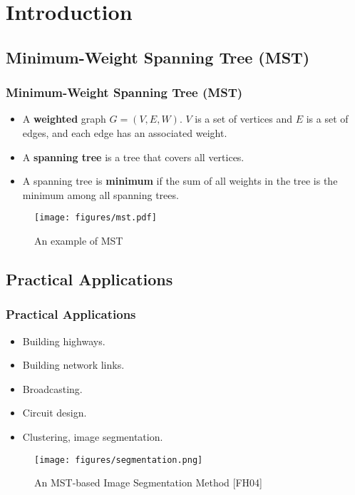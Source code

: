 \section{Introduction}

\subsection{Minimum-Weight Spanning Tree (MST)}

\begin{frame}
\frametitle{Minimum-Weight Spanning Tree (MST)}

\begin{itemize}
  \item A \textbf{weighted} graph $G = (V,E,W)$. $V$ is a set of vertices and $E$ is a set of edges, and each edge has an associated weight.
  \item A \textbf{spanning tree} is a tree that covers all vertices.
  \item A spanning tree is \textbf{minimum} if the sum of all weights in the tree is the minimum among all spanning trees.
\end{itemize}
\begin{figure}
    \centering
    \texttt{[image: figures/mst.pdf]}
    \caption{An example of MST}
\end{figure}
\end{frame}

\subsection{Practical Applications}

\begin{frame}
\frametitle{Practical Applications}
\begin{itemize}
  \item Building highways.
  \item Building network links.
  \item Broadcasting.
  \item Circuit design.
  \item Clustering, image segmentation.
\end{itemize}
\begin{figure}
    \centering
    \texttt{[image: figures/segmentation.png]}
    \caption{An MST-based Image Segmentation Method [FH04]}
\end{figure}
\end{frame}


